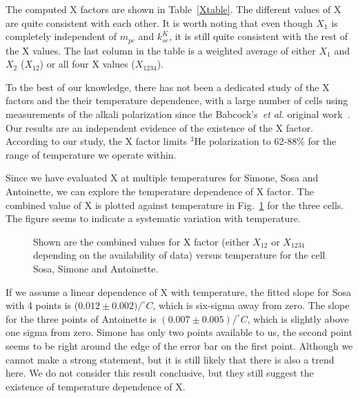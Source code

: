 The computed X factors are shown in Table~\ref{Xtable}. The different values of X are quite consistent with each other. It is worth noting that even though $X_1$ is completely independent of $m_{pc}$ and $k_{se}^K$, it is still quite consistent with the rest of the X values. The last column in the table is a weighted average of either $X_1$ and $X_2$ ($X_{12}$) or all four X values ($X_{1234}$). 

To the best of our knowledge, there has not been a dedicated study of the X factors and the their temperature dependence, with a large number of cells using measurements of the alkali polarization since the Babcock's~\emph{et al.} original work~\cite{PhysRevLett.96.083003}. Our results are an independent evidence of the existence of the X factor. According to our study, the X factor limits $^3$He polarization to 62-88\% for the range of temperature we operate within.

Since we have evaluated X at multiple temperatures for Simone, Sosa and Antoinette, we can explore the temperature dependence of X factor. The combined value of X is plotted against temperature in Fig.~\ref{XvsT} for the three cells. The figure seems to indicate a systematic variation with temperature.

\begin{figure}[t!]
	\label{XvsT}
	\centering
	\caption{{Shown are the combined values for X factor (either $X_{12}$ or $X_{1234}$ depending on the availability of data) versus temperature for the cell Sosa, Simone and Antoinette.}}
\end{figure}

If we assume a linear dependence of X with temperature, the fitted slope for Sosa with 4 points is ($0.012\pm0.002)/^\circ C$, which is six-sigma away from zero. The slope for the three points of Antoinette is $(0.007\pm0.005)/^\circ C$, which is slightly above one sigma from zero. Simone has only two points available to us, the second point seems to be right around the edge of the error bar on the first point. Although we cannot make a strong statement, but it is still likely that there is also a trend here. We do not consider this result conclusive, but they still suggest the existence of temperature dependence of X.

